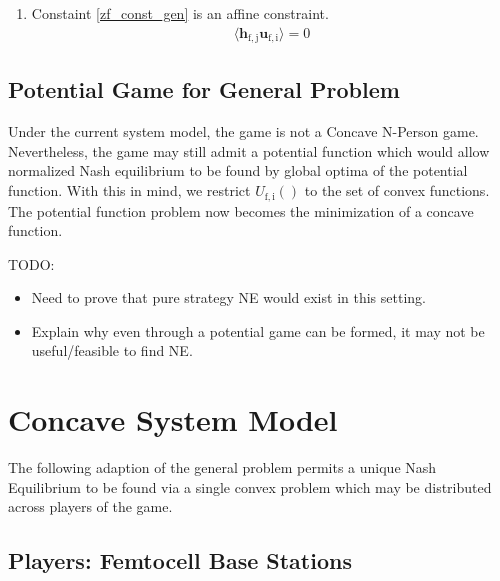 \documentclass[12pt,a4paper]{report}
\begin{document}
\begin{enumerate}
\item 
	Constaint \eqref{zf_const_gen} is an affine constraint. 
		\begin{gather*}
		\langle \mathbf{h_{\mathrm{f,j}}}\mathbf{u_{\mathrm{f,i}}} \rangle =0
		\end{gather*}

\end{enumerate}

\subsection{Potential Game for General Problem}
Under the current system model, the game is not a Concave N-Person game. Nevertheless, the game may still admit a potential function which would allow normalized Nash equilibrium to be found by global optima of the potential function. With this in mind, we restrict $U_{\mathrm{f,i}}() $ to the set of convex functions. The potential function problem now becomes the minimization of a concave function.

TODO: 
\begin{itemize}
\item Need to prove that pure strategy NE would exist in this setting.
\item Explain why even through a potential game can be formed, it may not be useful/feasible to find NE. 
\end{itemize}

\section{Concave System Model}\label{conmodel}
The following adaption of the general problem permits a unique Nash Equilibrium to be found via a single convex problem which may be distributed across players of the game.
\subsection{Players: Femtocell Base Stations}
\end{document}
